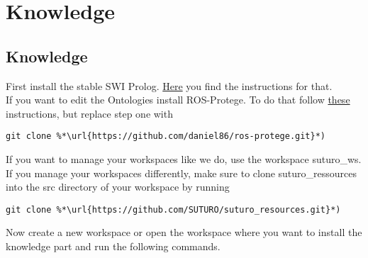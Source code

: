 \documentclass[main.tex]{subfiles}
\begin{document}
\section{Knowledge}
\subsection{Knowledge}
First install the stable SWI Prolog. \href{https://www.swi-prolog.org/build/PPA.html}{Here} you find the instructions for that.\\
If you want to edit the Ontologies install ROS-Protege. To do that follow \href{https://github.com/protegeproject/protege/wiki/Building-from-Source}{these} instructions, but replace step one with\\
\begin{lstlisting}
git clone %*\url{https://github.com/daniel86/ros-protege.git}*)
\end{lstlisting}

If you want to manage your workspaces like we do, use the workspace suturo\_ws.\\
If you manage your workspaces differently, make sure to clone suturo\_ressources into the src directory of your workspace by running\\
\begin{lstlisting}
git clone %*\url{https://github.com/SUTURO/suturo_resources.git}*) 
\end{lstlisting}
Now create a new workspace or open the workspace where you want to install the knowledge part and run the following commands.\\
\begin{mdframed}[backgroundcolor=mygray, rightline=false]

\end{mdframed}
\end{document}
